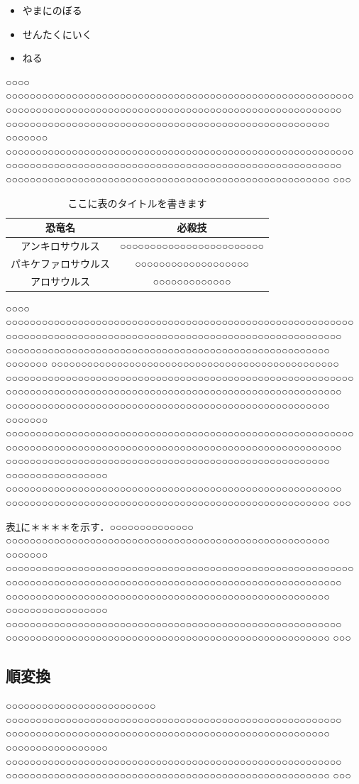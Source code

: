 \begin{itemize}
\item やまにのぼる
\item せんたくにいく
\item ねる
\end{itemize}

○○○○ ○○○○○○○○○○○○○○○○○○○○○○○○○○○○○○○○○○○○○○○○○○○○○○○○○○○○○○○○○○ ○○○○○○○○○○○○○○○○○○○○○○○○○○○○○○○○○○○○○○○○○○○○○○○○○○○○○○○○ ○○○○○○○○○○○○○○○○○○○○○○○○○○○○○○○○○○○○○○○○○○○○○○○○○○○○○○ ○○○○○○○ ○○○○○○○○○○○○○○○○○○○○○○○○○○○○○○○○○○○○○○○○○○○○○○○○○○○○○○○○○○ ○○○○○○○○○○○○○○○○○○○○○○○○○○○○○○○○○○○○○○○○○○○○○○○○○○○○○○○○ ○○○○○○○○○○○○○○○○○○○○○○○○○○○○○○○○○○○○○○○○○○○○○○○○○○○○○○ ○○○

\begin{table}
\begin{center}
\caption{ここに表のタイトルを書きます}\label{AAA}
\begin{tabular}{cc}
\hline
恐竜名 & 必殺技 \\
\hline
アンキロサウルス & ○○○○○○○○○○○○○○○○○○○○○○○○  \\
パキケファロサウルス & ○○○○○○○○○○○○○○○○○○○  \\
アロサウルス & ○○○○○○○○○○○○○  \\
\hline
\end{tabular}
\end{center}
\end{table}
○○○○ ○○○○○○○○○○○○○○○○○○○○○○○○○○○○○○○○○○○○○○○○○○○○○○○○○○○○○○○○○○ ○○○○○○○○○○○○○○○○○○○○○○○○○○○○○○○○○○○○○○○○○○○○○○○○○○○○○○○○ ○○○○○○○○○○○○○○○○○○○○○○○○○○○○○○○○○○○○○○○○○○○○○○○○○○○○○○ ○○○○○○○ ○○○○○○○○○○○○○○○○○○○○○○○○○○○○○○○○○○○○○○○○○○○○○○○○ ○○○○○○○○○○○○○○○○○○○○○○○○○○○○○○○○○○○○○○○○○○○○○○○○○○○○○○○○○○ ○○○○○○○○○○○○○○○○○○○○○○○○○○○○○○○○○○○○○○○○○○○○○○○○○○○○○○○○ ○○○○○○○○○○○○○○○○○○○○○○○○○○○○○○○○○○○○○○○○○○○○○○○○○○○○○○ ○○○○○○○ ○○○○○○○○○○○○○○○○○○○○○○○○○○○○○○○○○○○○○○○○○○○○○○○○○○○○○○○○○○ ○○○○○○○○○○○○○○○○○○○○○○○○○○○○○○○○○○○○○○○○○○○○○○○○○○○○○○○○ ○○○○○○○○○○○○○○○○○○○○○○○○○○○○○○○○○○○○○○○○○○○○○○○○○○○○○○ ○○○○○○○○○○○○○○○○○ ○○○○○○○○○○○○○○○○○○○○○○○○○○○○○○○○○○○○○○○○○○○○○○○○○○○○○○○○ ○○○○○○○○○○○○○○○○○○○○○○○○○○○○○○○○○○○○○○○○○○○○○○○○○○○○○○ ○○○

表\ref{AAA}に＊＊＊＊を示す．○○○○○○○○○○○○○○ ○○○○○○○○○○○○○○○○○○○○○○○○○○○○○○○○○○○○○○○○○○○○○○○○○○○○○○ ○○○○○○○ ○○○○○○○○○○○○○○○○○○○○○○○○○○○○○○○○○○○○○○○○○○○○○○○○○○○○○○○○○○ ○○○○○○○○○○○○○○○○○○○○○○○○○○○○○○○○○○○○○○○○○○○○○○○○○○○○○○○○ ○○○○○○○○○○○○○○○○○○○○○○○○○○○○○○○○○○○○○○○○○○○○○○○○○○○○○○ ○○○○○○○○○○○○○○○○○ ○○○○○○○○○○○○○○○○○○○○○○○○○○○○○○○○○○○○○○○○○○○○○○○○○○○○○○○○ ○○○○○○○○○○○○○○○○○○○○○○○○○○○○○○○○○○○○○○○○○○○○○○○○○○○○○○ ○○○
\subsection{順変換}\label{QWERT}
○○○○○○○○○○○○○○○○○○○○○○○○○ ○○○○○○○○○○○○○○○○○○○○○○○○○○○○○○○○○○○○○○○○○○○○○○○○○○○○○○○○ ○○○○○○○○○○○○○○○○○○○○○○○○○○○○○○○○○○○○○○○○○○○○○○○○○○○○○○ ○○○○○○○○○○○○○○○○○ ○○○○○○○○○○○○○○○○○○○○○○○○○○○○○○○○○○○○○○○○○○○○○○○○○○○○○○○○ ○○○○○○○○○○○○○○○○○○○○○○○○○○○○○○○○○○○○○○○○○○○○○○○○○○○○○○ ○○○
